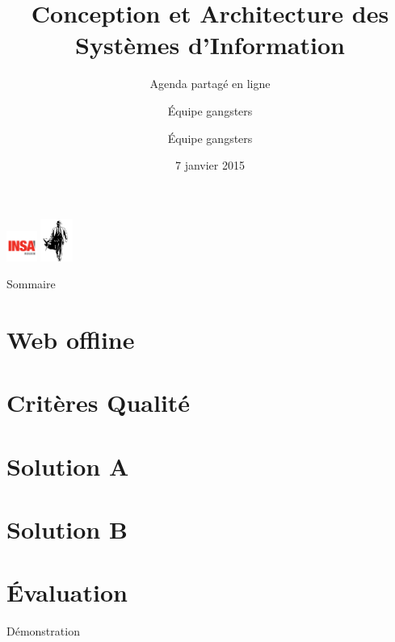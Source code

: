 \documentclass[9pt,table]{beamer}
\title{Conception et Architecture des Systèmes d'Information}
\subtitle{Agenda partagé en ligne}
\author{Équipe gangsters}
\date{7 janvier 2015}
\begin{document}
\begin{frame}[plain]
	\titlepage
	\begin{center}
		\includegraphics[height=10mm]{images/logoInsa} \hspace{0.5cm}
		\includegraphics[height=14mm]{images/logoGangsters} \hspace{0.5cm}
	\end{center}
\end{frame}

\begin{frame}{Sommaire}
	 \vspace{1cm}
	 \tableofcontents
\end{frame}
\section{Web offline}


\section{Critères Qualité}


\section{Solution A}


\section{Solution B}


\author{Équipe gangsters}
\section{\'Evaluation}
\begin{frame}{Démonstration}
 
\end{frame}
\end{document}
